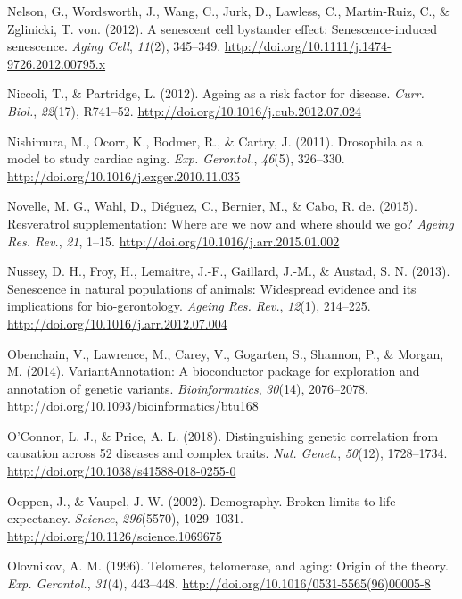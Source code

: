 \documentclass[12pt,twoside]{unicam}
\begin{document}
\begin{cslreferences}
\leavevmode\hypertarget{ref-Nelson2012}{}%
Nelson, G., Wordsworth, J., Wang, C., Jurk, D., Lawless, C., Martin-Ruiz, C., \& Zglinicki, T. von. (2012). A senescent cell bystander effect: Senescence-induced senescence. \emph{Aging Cell}, \emph{11}(2), 345--349. \url{http://doi.org/10.1111/j.1474-9726.2012.00795.x}

\leavevmode\hypertarget{ref-Niccoli2012}{}%
Niccoli, T., \& Partridge, L. (2012). Ageing as a risk factor for disease. \emph{Curr. Biol.}, \emph{22}(17), R741--52. \url{http://doi.org/10.1016/j.cub.2012.07.024}

\leavevmode\hypertarget{ref-Nishimura2011}{}%
Nishimura, M., Ocorr, K., Bodmer, R., \& Cartry, J. (2011). Drosophila as a model to study cardiac aging. \emph{Exp. Gerontol.}, \emph{46}(5), 326--330. \url{http://doi.org/10.1016/j.exger.2010.11.035}

\leavevmode\hypertarget{ref-Novelle2015}{}%
Novelle, M. G., Wahl, D., Diéguez, C., Bernier, M., \& Cabo, R. de. (2015). Resveratrol supplementation: Where are we now and where should we go? \emph{Ageing Res. Rev.}, \emph{21}, 1--15. \url{http://doi.org/10.1016/j.arr.2015.01.002}

\leavevmode\hypertarget{ref-Nussey2013}{}%
Nussey, D. H., Froy, H., Lemaitre, J.-F., Gaillard, J.-M., \& Austad, S. N. (2013). Senescence in natural populations of animals: Widespread evidence and its implications for bio-gerontology. \emph{Ageing Res. Rev.}, \emph{12}(1), 214--225. \url{http://doi.org/10.1016/j.arr.2012.07.004}

\leavevmode\hypertarget{ref-Obenchain2014}{}%
Obenchain, V., Lawrence, M., Carey, V., Gogarten, S., Shannon, P., \& Morgan, M. (2014). VariantAnnotation: A bioconductor package for exploration and annotation of genetic variants. \emph{Bioinformatics}, \emph{30}(14), 2076--2078. \url{http://doi.org/10.1093/bioinformatics/btu168}

\leavevmode\hypertarget{ref-OConnor2018}{}%
O'Connor, L. J., \& Price, A. L. (2018). Distinguishing genetic correlation from causation across 52 diseases and complex traits. \emph{Nat. Genet.}, \emph{50}(12), 1728--1734. \url{http://doi.org/10.1038/s41588-018-0255-0}

\leavevmode\hypertarget{ref-Oeppen2002}{}%
Oeppen, J., \& Vaupel, J. W. (2002). Demography. Broken limits to life expectancy. \emph{Science}, \emph{296}(5570), 1029--1031. \url{http://doi.org/10.1126/science.1069675}

\leavevmode\hypertarget{ref-Olovnikov1996}{}%
Olovnikov, A. M. (1996). Telomeres, telomerase, and aging: Origin of the theory. \emph{Exp. Gerontol.}, \emph{31}(4), 443--448. \url{http://doi.org/10.1016/0531-5565(96)00005-8}


\end{cslreferences}
\end{document}

